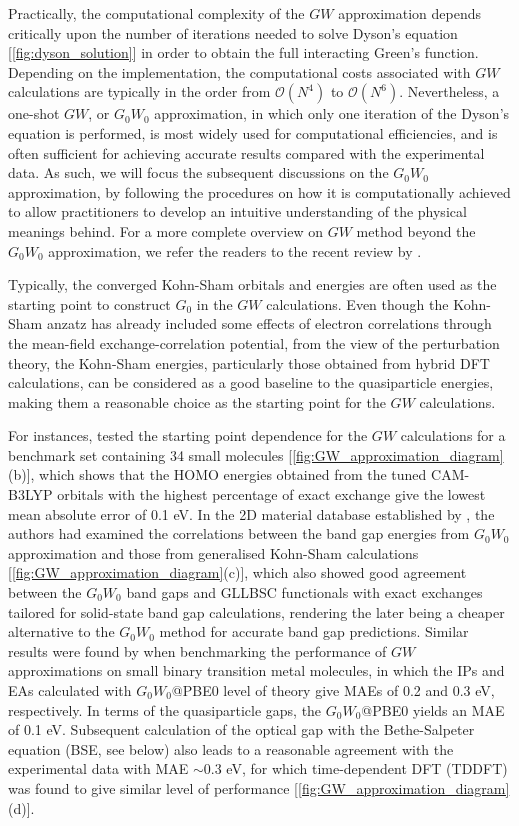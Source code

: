 
Practically, the computational complexity of the $GW$ approximation depends critically upon the number of iterations needed to solve  Dyson's equation [\cref{fig:dyson_solution}] in order to obtain the full interacting Green's function. Depending on the implementation, the computational costs associated with $GW$ calculations are typically in the order from $\mathcal{O}(N^4)$ to $\mathcal{O}(N^6)$.\cite{golze2019gw} Nevertheless,  a one-shot $GW$, or $G_0 W_0$ approximation, in which only one iteration of the Dyson's equation is performed, is most widely used for computational efficiencies, and is often sufficient for achieving accurate results compared with the experimental data.\cite{yan2010band,liu2011he,li2012impact} As such, we will focus the subsequent discussions on the $G_0 W_0$ approximation, by following the procedures on how it is computationally achieved to allow practitioners to develop an intuitive understanding of the physical meanings behind. For a more complete overview on $GW$ method beyond the $G_0 W_0$ approximation, we refer the readers to the recent review by \citet{golze2019gw}.

Typically, the converged Kohn-Sham orbitals and energies are often used as the starting point to construct $G_0$ in the $GW$ calculations. Even though the Kohn-Sham anzatz has already included some effects of electron correlations through the mean-field exchange-correlation potential, from the view of the perturbation theory, the Kohn-Sham energies, particularly those obtained from hybrid DFT calculations, can be considered as a good baseline to the quasiparticle energies, making them a reasonable choice as the starting point for the $GW$ calculations. 

For instances, \citet{bruneval2013benchmarking} tested the starting point dependence for the $GW$ calculations for a benchmark set containing 34 small molecules [\cref{fig:GW_approximation_diagram}(b)], which shows that the HOMO energies obtained from the tuned CAM-B3LYP orbitals with the highest percentage of exact exchange give the lowest mean absolute error of 0.1 eV.  In the 2D material database established by \citet{haastrup2018}, the authors had examined the correlations between the band gap energies from $G_0 W_0$ approximation and those from generalised Kohn-Sham calculations [\cref{fig:GW_approximation_diagram}(c)], which also showed good agreement between the $G_0 W_0$ band gaps and GLLBSC functionals with exact exchanges tailored for solid-state band gap calculations, rendering the later being a cheaper alternative to the $G_0 W_0$ method for accurate band gap predictions.  Similar results were found by \citet{korbel2014benchmark} when benchmarking the performance of $GW$ approximations on small binary transition metal molecules, in which the IPs and EAs calculated with $G_0 W_0$@PBE0 level of theory give MAEs of 0.2 and 0.3 eV, respectively. In terms of the quasiparticle gaps, the $G_0 W_0$@PBE0 yields an MAE of 0.1 eV. Subsequent calculation of the optical gap with the Bethe-Salpeter equation (BSE, see below) also leads to a reasonable agreement with the experimental data with MAE $\sim 0.3$ eV, for which time-dependent DFT (TDDFT) was found to give similar level of performance  [\cref{fig:GW_approximation_diagram}(d)].

